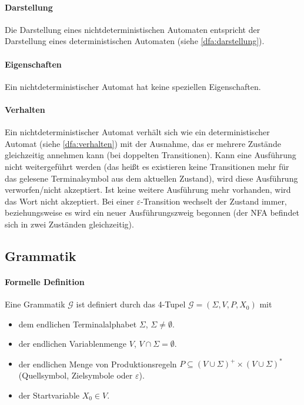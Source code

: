 \documentclass[a4paper, 11pt, accentcolor = tud3b]{tudreport}
\begin{document}
            \paragraph{Darstellung}
                Die Darstellung eines nichtdeterministischen Automaten entspricht der Darstellung eines deterministischen Automaten (siehe \ref{dfa:darstellung}).

            \paragraph{Eigenschaften}
                Ein nichtdeterministischer Automat hat keine speziellen Eigenschaften.

            \paragraph{Verhalten}
                Ein nichtdeterministischer Automat verhält sich wie ein deterministischer Automat (siehe \ref{dfa:verhalten}) mit der Ausnahme, das er mehrere Zustände gleichzeitig annehmen kann (bei doppelten Transitionen). Kann eine Ausführung nicht weitergeführt werden (das heißt es existieren keine Transitionen mehr für das gelesene Terminalsymbol aus dem aktuellen Zustand), wird diese Ausführung verworfen/nicht akzeptiert. Ist keine weitere Ausführung mehr vorhanden, wird das Wort nicht akzeptiert. Bei einer $ \varepsilon $-Transition wechselt der Zustand immer, beziehungsweise es wird ein neuer Ausführungszweig begonnen (der NFA befindet sich in zwei Zuständen gleichzeitig).


        \subsection{Grammatik}
            \paragraph{Formelle Definition}
                Eine Grammatik $ \mathcal{G} $ ist definiert durch das 4-Tupel $ \mathcal{G} = (\Sigma, V, P, X _ 0) $ mit
                \begin{itemize}
                    \item dem endlichen Terminalalphabet $ \Sigma $, $ \Sigma \neq \emptyset $.
                    \item der endlichen Variablenmenge $ V $, $ V \cap \Sigma = \emptyset $.
                    \item der endlichen Menge von Produktionsregeln $ P \subseteq (V \cup \Sigma) ^ + \times (V \cup \Sigma) ^ * $ (Quellsymbol, Zielsymbole oder $ \varepsilon $).
                    \item der Startvariable $ X _ 0 \in V $.
                \end{itemize}
\end{document}
